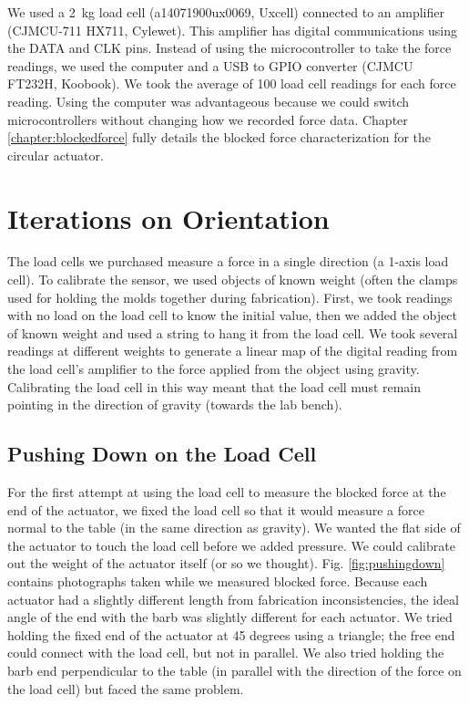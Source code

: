 We used a 2~kg load cell (a14071900ux0069, Uxcell) connected to an amplifier (CJMCU-711 HX711, Cylewet). This amplifier has digital communications using the DATA and CLK pins. Instead of using the microcontroller to take the force readings, we used the computer and a USB to GPIO converter (CJMCU FT232H, Koobook). We took the average of 100 load cell readings for each force reading. Using the computer was advantageous because we could switch microcontrollers without changing how we recorded force data. Chapter \ref{chapter:blockedforce} fully details the blocked force characterization for the circular actuator. 

\section{Iterations on Orientation}

The load cells we purchased measure a force in a single direction (a 1-axis load cell). To calibrate the sensor, we used objects of known weight (often the clamps used for holding the molds together during fabrication). First, we took readings with no load on the load cell to know the initial value, then we added the object of known weight and used a string to hang it from the load cell. We took several readings at different weights to generate a linear map of the digital reading from the load cell's amplifier to the force applied from the object using gravity. Calibrating the load cell in this way meant that the load cell must remain pointing in the direction of gravity (towards the lab bench). 

\subsection{Pushing Down on the Load Cell}

For the first attempt at using the load cell to measure the blocked force at the end of the actuator, we fixed the load cell so that it would measure a force normal to the table (in the same direction as gravity). We wanted the flat side of the actuator to touch the load cell before we added pressure. We could calibrate out the weight of the actuator itself (or so we thought). Fig. \ref{fig:pushingdown} contains photographs taken while we measured blocked force. Because each actuator had a slightly different length from fabrication inconsistencies, the ideal angle of the end with the barb was slightly different for each actuator. We tried holding the fixed end of the actuator at 45 degrees using a triangle; the free end could connect with the load cell, but not in parallel. We also tried holding the barb end perpendicular to the table (in parallel with the direction of the force on the load cell) but faced the same problem. 

